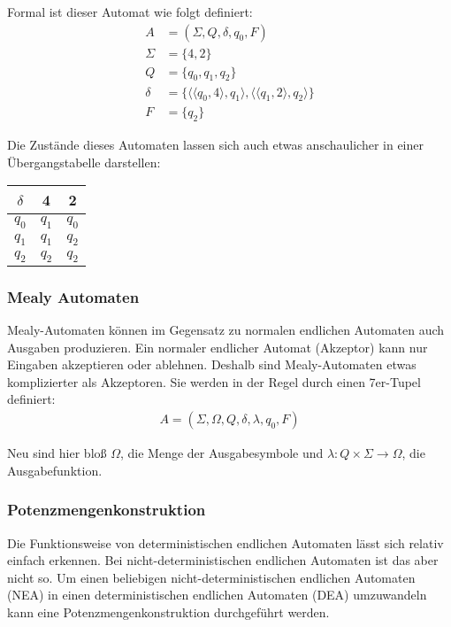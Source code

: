 \begin{flushleft}
Formal ist dieser Automat wie folgt definiert:
\begin{align}
    A &= (\Sigma,Q,\delta,q_0,F) \\
    \Sigma &= \{4,2\} \\
    Q &= \{q_0,q_1,q_2\} \\
    \delta &= \{\langle \langle q_0, 4 \rangle, q_1 \rangle, \langle \langle q_1, 2 \rangle, q_2 \rangle \} \\
    F &= \{q_2\}
\end{align}

Die Zustände dieses Automaten lassen sich auch etwas anschaulicher in einer Übergangstabelle darstellen:
\end{flushleft}

\begin{center}
\begin{tabular}{|c|c|c|}
    \hline
    $\delta$ & 4 & 2 \\
    \hline
    $q_0$ & $q_1$ & $q_0$ \\
    \hline
    $q_1$ & $q_1$ & $q_2$ \\
    \hline
    $q_2$ & $q_2$ & $q_2$ \\
    \hline
\end{tabular}
\end{center}

\subsubsection{Mealy Automaten}
\begin{flushleft}
Mealy-Automaten können im Gegensatz zu normalen endlichen Automaten
auch Ausgaben produzieren. Ein normaler endlicher Automat (Akzeptor)
kann nur Eingaben akzeptieren oder ablehnen. Deshalb sind
Mealy-Automaten etwas komplizierter als Akzeptoren.
Sie werden in der Regel durch einen 7er-Tupel definiert:
\begin{align}
    A=(\Sigma,\Omega,Q,\delta,\lambda,q_0,F)
\end{align}

Neu sind hier bloß $\Omega$,
die Menge der Ausgabesymbole und
$\lambda: Q \times \Sigma \rightarrow \Omega$, die Ausgabefunktion.
\end{flushleft}

\subsubsection{Potenzmengenkonstruktion}
\begin{flushleft}
Die Funktionsweise von deterministischen endlichen Automaten
lässt sich relativ einfach erkennen. Bei nicht-deterministischen
endlichen Automaten ist das aber nicht so. Um einen beliebigen
nicht-deterministischen endlichen Automaten (NEA) in einen
deterministischen endlichen Automaten (DEA) umzuwandeln kann
eine Potenzmengenkonstruktion durchgeführt werden.
\end{flushleft}

